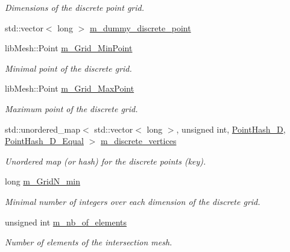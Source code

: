 \begin{DoxyCompactItemize}
\begin{DoxyCompactList}\small\item\em Dimensions of the discrete point grid. \end{DoxyCompactList}\item 
std\+::vector$<$ long $>$ \hyperlink{classcarl_1_1_mesh___intersection_aa84e7b362c2187f100591e5e3fef33e5}{m\+\_\+dummy\+\_\+discrete\+\_\+point}
\item 
lib\+Mesh\+::\+Point \hyperlink{classcarl_1_1_mesh___intersection_a415abd921fae83d405751d1dcc0957db}{m\+\_\+\+Grid\+\_\+\+Min\+Point}
\begin{DoxyCompactList}\small\item\em Minimal point of the discrete grid. \end{DoxyCompactList}\item 
lib\+Mesh\+::\+Point \hyperlink{classcarl_1_1_mesh___intersection_a98f86004df38485ed880b054b94f5c7d}{m\+\_\+\+Grid\+\_\+\+Max\+Point}
\begin{DoxyCompactList}\small\item\em Maximum point of the discrete grid. \end{DoxyCompactList}\item 
std\+::unordered\+\_\+map$<$ std\+::vector$<$ long $>$, unsigned int, \hyperlink{structcarl_1_1_point_hash__3_d}{Point\+Hash\+\_\+D}, \hyperlink{structcarl_1_1_point_hash__3_d___equal}{Point\+Hash\+\_\+D\+\_\+\+Equal} $>$ \hyperlink{classcarl_1_1_mesh___intersection_a5c5abcce2f778e50c5c8a5265692c96f}{m\+\_\+discrete\+\_\+vertices}
\begin{DoxyCompactList}\small\item\em Unordered map (or hash) for the discrete points (key). \end{DoxyCompactList}\item 
long \hyperlink{classcarl_1_1_mesh___intersection_af5d973b0c2505d89bf1c9f7b29585b80}{m\+\_\+\+Grid\+N\+\_\+min}
\begin{DoxyCompactList}\small\item\em Minimal number of integers over each dimension of the discrete grid. \end{DoxyCompactList}\item 
unsigned int \hyperlink{classcarl_1_1_mesh___intersection_acd2052a59c0bc759f86b3e4810093a54}{m\+\_\+nb\+\_\+of\+\_\+elements}
\begin{DoxyCompactList}\small\item\em Number of elements of the intersection mesh. \end{DoxyCompactList}\item 

\end{DoxyCompactItemize}
